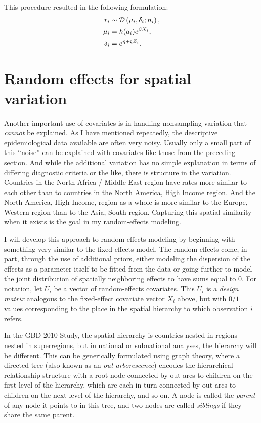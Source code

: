 This procedure resulted in the following
formulation:
\begin{align*}
r_i &\sim \mathcal{D}\left(\mu_i, \delta_i; n_i\right),\\
\mu_i &= h(a_i)e^{\beta X_i},\\
\delta_i &= e^{\eta + \zeta Z_i}.
\end{align*}

\section{Random effects for spatial variation}
Another important use of covariates is in handling nonsampling
variation that \emph{cannot} be explained. As I have mentioned
repeatedly, the descriptive epidemiological data available are often
very noisy.  Usually only a small part of this ``noise''
can be explained with covariates like those from the preceding
section. And while the additional variation has no simple explanation
in terms of differing diagnostic criteria or the like, there is
structure in the variation. Countries in the North Africa / Middle East
region have rates more similar to each other than to countries in the
North America, High Income region.  And the North America, High Income,
region as a whole is more similar to the Europe, Western region than
to the Asia, South region.  Capturing this spatial similarity when it
exists is the goal in my random-effects modeling.

I will develop this approach to random-effects modeling by beginning
with something very similar to the fixed-effects model.  The random
effects come, in part, through the use of additional priors, either
modeling the dispersion of the effects as a parameter itself to be
fitted from the data or going further to model the joint distribution of
spatially neighboring effects to have sums equal to $0$.  For
notation, let $U_i$ be a vector of random-effects covariates.  This
$U_i$ is a \emph{design matrix} analogous to the fixed-effect
covariate vector $X_i$ above, but with $0$/$1$ values corresponding
to the place in the spatial hierarchy to which observation $i$ refers.

In the GBD 2010 Study, the spatial hierarchy is countries nested in regions
nested in superregions, but in national or subnational analyses, the
hierarchy will be different. This can be generically formulated using
graph theory, where a directed tree (also known as an
\emph{out-arborescence}) encodes the hierarchical relationship
structure with a root node connected by out-arcs to children on the
first level of the hierarchy, which are each in turn connected by
out-arcs to children on the next level of the hierarchy, and so on.  A
node is called the \emph{parent} of any node it points to in this
tree, and two nodes are called \emph{siblings} if they share the same
parent.


